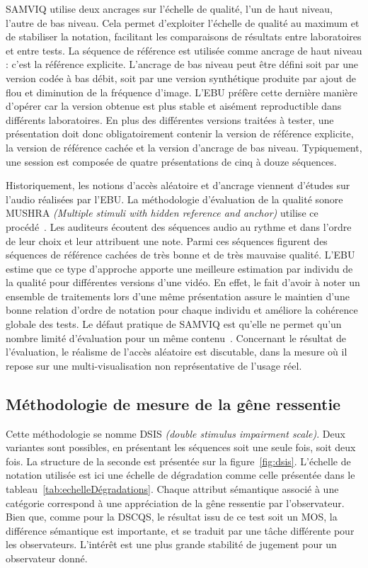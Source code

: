 SAMVIQ utilise deux ancrages sur l'échelle de qualité, l'un de haut niveau, l'autre de bas niveau. Cela permet d'exploiter l'échelle de qualité au maximum et de stabiliser la notation, facilitant les comparaisons de résultats entre laboratoires et entre tests. La séquence de référence est utilisée comme ancrage de haut niveau : c'est la référence explicite. L'ancrage de bas niveau peut être défini soit par une version codée à bas débit, soit par une version synthétique produite par ajout de flou et diminution de la fréquence d'image. L'EBU préfère cette dernière manière d'opérer car la version obtenue est plus stable et aisément reproductible dans différents laboratoires. En plus des différentes versions traitées à tester, une présentation doit donc obligatoirement contenir la version de référence explicite, la version de référence cachée et la version d'ancrage de bas niveau. Typiquement, une session est composée de quatre présentations de cinq à douze séquences.

Historiquement, les notions d'accès aléatoire et d'ancrage viennent d'études sur l'audio réalisées par l'EBU. La méthodologie d'évaluation de la qualité sonore MUSHRA \emph{(Multiple stimuli with hidden reference and anchor)} utilise ce procédé~\cite{kozamernik-mushra,itu-bs1534}. Les auditeurs écoutent des séquences audio au rythme et dans l’ordre de leur choix et leur attribuent une note. Parmi ces séquences figurent des séquences de référence cachées de très bonne et de très mauvaise qualité. L'EBU estime que ce type d'approche apporte une meilleure estimation par individu de la qualité pour différentes versions d'une vidéo. En effet, le fait d'avoir à noter un ensemble de traitements lors d'une même présentation assure le maintien d'une bonne relation d'ordre de notation pour chaque individu et améliore la cohérence globale des tests. Le défaut pratique de SAMVIQ est qu'elle ne permet qu'un nombre limité d'évaluation pour un même contenu~\cite{huynhthu-vpqm2007}. Concernant le résultat de l'évaluation, le réalisme de l'accès aléatoire est discutable, dans la mesure où il repose sur une multi-visualisation non représentative de l'usage réel.


\subsection{Méthodologie de mesure de la gêne ressentie}
Cette méthodologie se nomme DSIS \emph{(double stimulus impairment scale)}. Deux variantes sont possibles, en présentant les séquences soit une seule fois, soit deux fois. La structure de la seconde est présentée sur la figure~\ref{fig:dsis}. L'échelle de notation utilisée est ici une échelle de dégradation comme celle présentée dans le tableau~\ref{tab:echelleDégradations}. Chaque attribut sémantique associé à une catégorie correspond à une appréciation de la gêne ressentie par l'observateur. Bien que, comme pour la DSCQS, le résultat issu de ce test soit un MOS, la différence sémantique est importante, et se traduit par une tâche différente pour les observateurs. L'intérêt est une plus grande stabilité de jugement pour un observateur donné.

